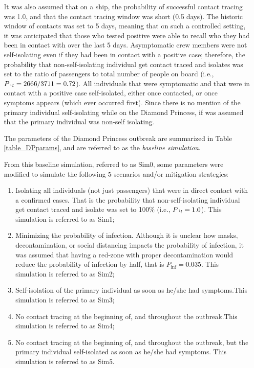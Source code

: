 \documentclass[sr]{drdc-report}
\def\Pinf{\ensuremath{P_\mathrm{inf}}}
\def\Pit{\ensuremath{P_{{\hspace{0.25em}}^\mathrm{i}t}}}
\begin{document}
It was also assumed that on a ship, the probability of successful contact tracing was 1.0, and that the contact tracing window was short (0.5 days). The historic window of contacts was set to 5 days, meaning that on such a controlled setting, it was anticipated that those who tested positive were able to recall who they had been in contact with over the last 5 days. Asymptomatic crew members were not self-isolating even if they had been in contact with a positive case; therefore, the probability that non-self-isolating individual get contact traced and isolates was set to the ratio of passengers to total number of people on board (i.e., $\Pit = 2666/3711 = 0.72$).  All individuals that were symptomatic and that were in contact with a positive case self-isolated, either once contacted, or once symptoms appears (which ever occurred first). Since there is no mention of the primary individual self-isolating while on the Diamond Princess, if was assumed that the primary individual was non-self isolating. 

The parameters of the Diamond Princess outbreak are summarized in Table \ref{table_DPparams}, and are referred to as the \textit{baseline simulation}. 

From this baseline simulation, referred to as Sim0, some parameters were modified to simulate the following 5 scenarios and/or mitigation strategies:
\begin{enumerate}
\item Isolating all individuals (not just passengers) that were in direct contact with a confirmed cases. That is the probability that non-self-isolating individual get contact traced and isolate was set to 100\% (i.e., $\Pit = 1.0$). This simulation is referred to as Sim1;
\item Minimizing the probability of infection. Although it is unclear how masks, decontamination, or social distancing impacts the probability of infection, it was assumed that having a red-zone with proper decontamination would reduce the probability of infection by half, that is $\Pinf = 0.035$. This simulation is referred to as Sim2;
\item Self-isolation of the primary individual as soon as he/she had symptoms.This simulation is referred to as Sim3;
\item No contact tracing at the beginning of, and throughout the outbreak.This simulation is referred to as Sim4;
\item No contact tracing at the beginning of, and throughout the outbreak, but the primary individual self-isolated as soon as he/she had symptoms. This simulation is referred to as Sim5. 
\end{enumerate}
\end{document}
